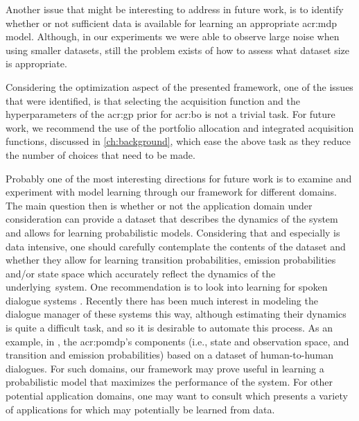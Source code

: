 Another issue that might be interesting to address in future work, is to identify whether or not sufficient data is available for learning an appropriate \acrshort{acr:mdp} model.
Although, in our experiments we were able to observe large noise when using smaller datasets, still the problem exists of how to assess what dataset size is appropriate.

Considering the optimization aspect of the presented framework, one of the issues that were identified, is that selecting the acquisition function and the hyperparameters of the \acrshort{acr:gp} prior for \acrshort{acr:bo} is not a trivial task.
For future work, we recommend the use of the portfolio allocation \cite{Hoffman2011, shahriari2016taking} and integrated acquisition \cite{snoek2012practical} functions, discussed in \autoref{ch:background}, which ease the above task as they reduce the number of choices that need to be made.

Probably one of the most interesting directions for future work is to examine and experiment with model learning through our framework for different domains.
The main question then is whether or not the application domain under consideration can provide a dataset that describes the dynamics of the system and allows for learning probabilistic models.
Considering that  and especially  is data intensive, one should carefully contemplate the contents of the dataset and whether they allow for learning transition probabilities, emission probabilities and/or state space which accurately reflect the dynamics of the underlying~system.
One recommendation is to look into learning  for spoken dialogue systems \cite{chinaei2011, png2011bayesian, young2016}.
Recently there has been much interest in modeling the dialogue manager of these systems this way, although estimating their dynamics is quite a difficult task, and so it is desirable to automate this process.
As an example, in \cite{chinaei2011}, the \acrshort{acr:pomdp}'s components (i.e., state and observation space, and transition and emission probabilities) based on a dataset of human-to-human dialogues.
For such domains, our framework may prove useful in learning a probabilistic model that maximizes the performance of the system.
For other potential application domains, one may want to consult \cite{cassandra1998spa} which presents a variety of applications for  which may potentially be learned from data.

